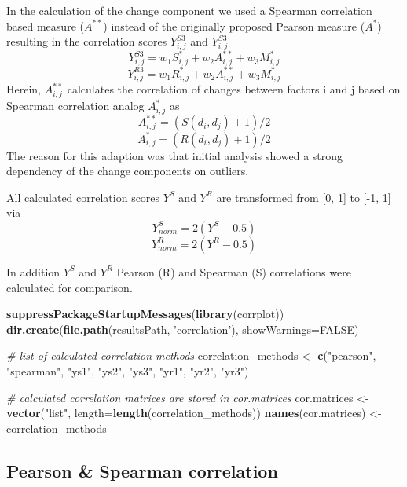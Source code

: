 \documentclass[]{article}
\newenvironment{Shaded}{\begin{snugshade}}{\end{snugshade}}
\newcommand{\KeywordTok}[1]{\textcolor[rgb]{0.13,0.29,0.53}{\textbf{{#1}}}}
\newcommand{\DataTypeTok}[1]{\textcolor[rgb]{0.13,0.29,0.53}{{#1}}}
\newcommand{\StringTok}[1]{\textcolor[rgb]{0.31,0.60,0.02}{{#1}}}
\newcommand{\CommentTok}[1]{\textcolor[rgb]{0.56,0.35,0.01}{\textit{{#1}}}}
\newcommand{\OtherTok}[1]{\textcolor[rgb]{0.56,0.35,0.01}{{#1}}}
\newcommand{\NormalTok}[1]{{#1}}
\begin{document}
In the calculation of the change component we used a Spearman
correlation based measure (\(A^{**}\)) instead of the originally
proposed Pearson measure (\(A^{*}\)) resulting in the correlation scores
\(Y_{i,j}^{S3}\) and \(Y_{i,j}^{S3}\)
\[Y_{i,j}^{S3} = w_1 S_{i,j}^{*} + w_2 A_{i,j}^{**} + w_3 M_{i,j}^{*}\]
\[Y_{i,j}^{R3} = w_1 R_{i,j}^{*} + w_2 A_{i,j}^{**} + w_3 M_{i,j}^{*}\]
Herein, \(A_{i,j}^{**}\) calculates the correlation of changes between
factors i and j based on Spearman correlation analog \(A_{i,j}^{*}\) as
\[A_{i,j}^{**}=(S(d_i,d_j)+1)/2\] \[A_{i,j}^{*}=(R(d_i,d_j)+1)/2\] The
reason for this adaption was that initial analysis showed a strong
dependency of the change components on outliers.

All calculated correlation scores \(Y^{S}\) and \(Y^{R}\) are
transformed from {[}0, 1{]} to {[}-1, 1{]} via
\[Y_{norm}^{S} = 2(Y^{S}-0.5)\] \[Y_{norm}^{R} = 2(Y^{R}-0.5)\]

In addition \(Y^{S}\) and \(Y^{R}\) Pearson (R) and Spearman (S)
correlations were calculated for comparison.

\begin{Shaded}
\begin{Highlighting}[]
\KeywordTok{suppressPackageStartupMessages}\NormalTok{(}\KeywordTok{library}\NormalTok{(corrplot))}
\KeywordTok{dir.create}\NormalTok{(}\KeywordTok{file.path}\NormalTok{(resultsPath, }\StringTok{'correlation'}\NormalTok{), }\DataTypeTok{showWarnings=}\OtherTok{FALSE}\NormalTok{)}

\CommentTok{# list of calculated correlation methods}
\NormalTok{correlation_methods <-}\StringTok{ }\KeywordTok{c}\NormalTok{(}\StringTok{"pearson"}\NormalTok{, }\StringTok{"spearman"}\NormalTok{, }\StringTok{"ys1"}\NormalTok{, }\StringTok{"ys2"}\NormalTok{, }\StringTok{"ys3"}\NormalTok{, }\StringTok{"yr1"}\NormalTok{, }\StringTok{"yr2"}\NormalTok{, }\StringTok{"yr3"}\NormalTok{)}

\CommentTok{# calculated correlation matrices are stored in cor.matrices}
\NormalTok{cor.matrices <-}\StringTok{ }\KeywordTok{vector}\NormalTok{(}\StringTok{"list"}\NormalTok{, }\DataTypeTok{length=}\KeywordTok{length}\NormalTok{(correlation_methods))}
\KeywordTok{names}\NormalTok{(cor.matrices) <-}\StringTok{ }\NormalTok{correlation_methods}
\end{Highlighting}
\end{Shaded}

\subsection{Pearson \& Spearman
correlation}\label{pearson-spearman-correlation}
\end{document}
